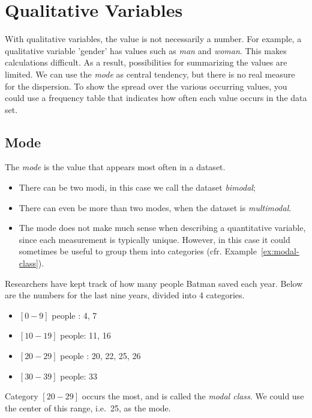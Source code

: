 \section{Qualitative Variables}
With qualitative variables, the value is not necessarily a number. For example, a qualitative variable 'gender' has values such as \emph{man} and \emph{woman}. This makes calculations difficult. As a result, possibilities for summarizing the values are limited. We can use the \emph{mode} as central tendency, but there is no real measure for the dispersion. To show the spread over the various occurring values, you could use a frequency table that indicates how often each value occurs in the data set.

\subsection{Mode}

\begin{definition}[Mode]
    The \emph{mode} is the value that appears most often in a dataset.
\end{definition}

\begin{itemize}
    \item There can be two modi, in this case we call the dataset \emph{bimodal};
    \item There can even be more than two modes, when the dataset is  \emph{multimodal}.
    \item The mode does not make much sense when describing a quantitative variable, since each measurement is typically unique. However, in this case it could sometimes be useful to group them into categories (cfr. Example~\ref{ex:modal-class}).
\end{itemize}

\begin{example}
    \label{ex:modal-class}
    Researchers have kept track of how many people Batman saved each year. 
    Below are the numbers for the last nine years, divided into 4 categories.
    
    \begin{itemize}
        \item $[0-9]$ people : 4, 7
        \item $[10-19]$ people: 11, 16
        \item $[20-29]$ people : 20, 22, 25, 26
        \item $[30-39]$ people: 33
    \end{itemize}
    
    Category $[20-29]$ occurs the most, and is called the \emph{modal class}. We could use the center of this range, i.e.~25, as the mode.
\end{example}

